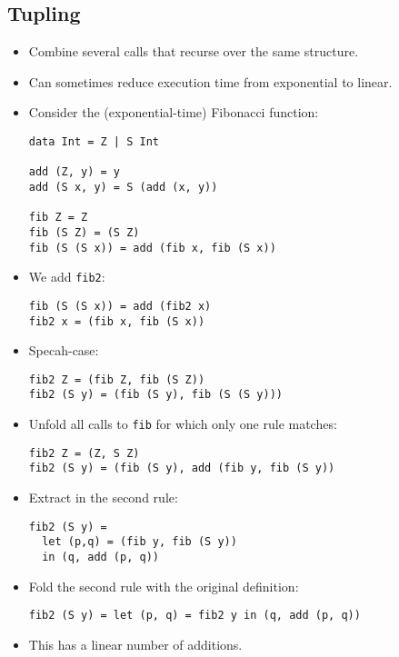 \subsection{Tupling}

\begin{itemize}

\item Combine several calls that recurse over the same structure.

\item Can sometimes reduce execution time from exponential to linear.

\item Consider the (exponential-time) Fibonacci function:

\begin{verbatim}
data Int = Z | S Int

add (Z, y) = y
add (S x, y) = S (add (x, y))

fib Z = Z
fib (S Z) = (S Z)
fib (S (S x)) = add (fib x, fib (S x))
\end{verbatim}

\item We add \texttt{fib2}:

\begin{verbatim}
fib (S (S x)) = add (fib2 x)
fib2 x = (fib x, fib (S x))
\end{verbatim}

\item Specah-case:

\begin{verbatim}
fib2 Z = (fib Z, fib (S Z))
fib2 (S y) = (fib (S y), fib (S (S y)))
\end{verbatim}

\item Unfold all calls to \texttt{fib} for which only one rule matches: 

\begin{verbatim}
fib2 Z = (Z, S Z)
fib2 (S y) = (fib (S y), add (fib y, fib (S y))
\end{verbatim}

\item Extract in the second rule:

\begin{verbatim}
fib2 (S y) =
  let (p,q) = (fib y, fib (S y))
  in (q, add (p, q))
\end{verbatim}

\item Fold the second rule with the original definition:

\begin{verbatim}
fib2 (S y) = let (p, q) = fib2 y in (q, add (p, q))
\end{verbatim}

\item This has a linear number of additions.

\end{itemize}

